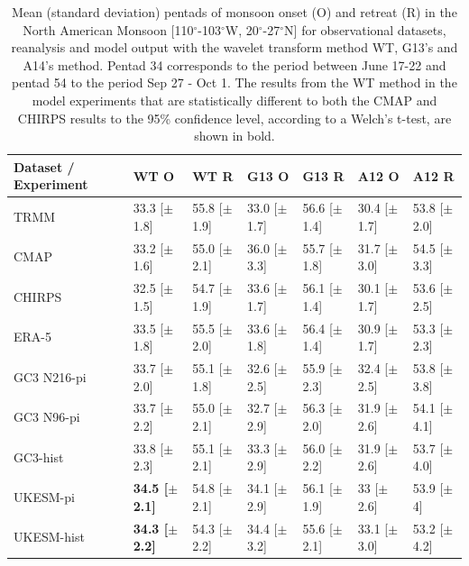 \begin{table}
\caption{Mean (standard deviation) pentads of monsoon onset (O) and retreat (R) in the North American Monsoon [110$^\circ$-103$^\circ$W, 20$^\circ$-27$^\circ$N] for observational datasets, reanalysis and model output with the wavelet transform method WT, G13's and A14's method. Pentad 34 corresponds to the period between June 17-22 and pentad 54 to the period Sep 27 - Oct 1. The results from the WT method in the model experiments that are statistically different to both the CMAP and CHIRPS results to the 95\% confidence level, according to a Welch's t-test, are shown in bold. }
\label{tab:3}       %
\begin{tabular}{p{2.2cm}p{1.765cm}p{1.765cm}p{1.765cm}p{1.765cm}p{1.7655cm}p{1.7655cm}}
\hline\noalign{\smallskip}
Dataset / Experiment & WT O 	& WT R 	& G13 O & G13 R & A12 O & A12 R \\ \hline
TRMM & 33.3 [$\pm$1.8] & 55.8 [$\pm$1.9] & 33.0 [$\pm$1.7] & 56.6 [$\pm$1.4] & 30.4 [$\pm$1.7] & 53.8 [$\pm$2.0]  \\
CMAP & 33.2 [$\pm$1.6] & 55.0 [$\pm$2.1] & 36.0 [$\pm$3.3] & 55.7 [$\pm$1.8] & 31.7 [$\pm$3.0] & 54.5 [$\pm$3.3]   \\
CHIRPS & 32.5 [$\pm$1.5] & 54.7 [$\pm$1.9] & 33.6 [$\pm$1.7]& 56.1 [$\pm$1.4] & 30.1 [$\pm$1.7] & 53.6 [$\pm$2.5]   \\
ERA-5 & 33.5 [$\pm$1.8] & 55.5 [$\pm$2.0] & 33.6 [$\pm$1.8]& 56.4 [$\pm$1.4] & 30.9 [$\pm$1.7] & 53.3 [$\pm$2.3]   \\
GC3 N216-pi  & 33.7 [$\pm$2.0] & 55.1 [$\pm$1.8]& 32.6 [$\pm$2.5] & 55.9 [$\pm$2.3] & 32.4 [$\pm$2.5] &53.8 [$\pm$3.8]  \\
GC3 N96-pi & 33.7 [$\pm$2.2] & 55.0 [$\pm$2.1] & 32.7 [$\pm$2.9] & 56.3 [$\pm$2.0] & 31.9 [$\pm$2.6] & 54.1 [$\pm$4.1]  \\
GC3-hist & 33.8 [$\pm$2.3] & 55.1 [$\pm$2.1]& 33.3 [$\pm$2.9] & 56.0 [$\pm$2.2] & 31.9 [$\pm$2.6] & 53.7 [$\pm$4.0]  \\
UKESM-pi & \bf{34.5} [$\pm$2.1] & 54.8 [$\pm$2.1] & 34.1 [$\pm$2.9] & 56.1 [$\pm$1.9] & 33 [$\pm$2.6] & 53.9 [$\pm$4]   \\
UKESM-hist & \bf{34.3} [$\pm$2.2] & 54.3 [$\pm$2.2]& 34.4 [$\pm$3.2] & 55.6 [$\pm$2.1] & 33.1 [$\pm$3.0] & 53.2 [$\pm$4.2] \\
\end{tabular}
\end{table}

